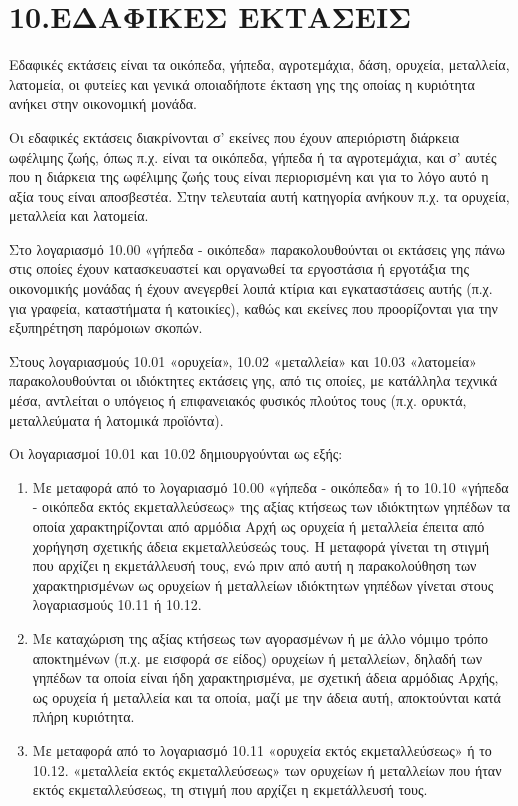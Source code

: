 \documentclass[A4,10pt,greek]{book}
\begin{document}
\section{10.ΕΔΑΦΙΚΕΣ ΕΚΤΑΣΕΙΣ}

Εδαφικές εκτάσεις είναι τα οικόπεδα, γήπεδα, αγροτεμάχια, δάση, ορυχεία, μεταλλεία, λατομεία, οι φυτείες και γενικά οποιαδήποτε έκταση γης της οποίας η κυριότητα ανήκει στην οικονομική μονάδα.

Οι εδαφικές εκτάσεις διακρίνονται σ' εκείνες που έχουν απεριόριστη διάρκεια ωφέλιμης ζωής, όπως π.χ. είναι τα οικόπεδα, γήπεδα ή τα αγροτεμάχια, και σ' αυτές που η διάρκεια της ωφέλιμης ζωής τους είναι περιορισμένη και για το λόγο αυτό η αξία τους είναι αποσβεστέα. Στην τελευταία αυτή κατηγορία ανήκουν π.χ.  τα ορυχεία, μεταλλεία και λατομεία.

Στο λογαριασμό 10.00 «γήπεδα - οικόπεδα» παρακολουθούνται οι εκτάσεις γης πάνω στις οποίες έχουν κατασκευαστεί και οργανωθεί τα εργοστάσια ή εργοτάξια της οικονομικής μονάδας ή έχουν ανεγερθεί λοιπά κτίρια και εγκαταστάσεις αυτής (π.χ. για γραφεία, καταστήματα ή κατοικίες), καθώς και εκείνες που προορίζονται για την εξυπηρέτηση παρόμοιων σκοπών.

Στους λογαριασμούς 10.01 «ορυχεία», 10.02 «μεταλλεία» και 10.03 «λατομεία» παρακολουθούνται οι ιδιόκτητες εκτάσεις γης, από τις οποίες, με κατάλληλα τεχνικά μέσα, αντλείται ο υπόγειος ή επιφανειακός φυσικός πλούτος τους (π.χ.  ορυκτά, μεταλλεύματα ή λατομικά προϊόντα).

Οι λογαριασμοί 10.01 και 10.02 δημιουργούνται ως εξής:

\begin{enumerate}

\item Με μεταφορά από το λογαριασμό 10.00 «γήπεδα - οικόπεδα» ή το 10.10 «γήπεδα - οικόπεδα εκτός εκμεταλλεύσεως» της αξίας κτήσεως των ιδιόκτητων γηπέδων τα οποία χαρακτηρίζονται από αρμόδια Αρχή ως ορυχεία ή μεταλλεία έπειτα από χορήγηση σχετικής άδεια εκμεταλλεύσεώς τους. Η μεταφορά γίνεται τη στιγμή που αρχίζει η εκμετάλλευσή τους, ενώ πριν από αυτή η παρακολούθηση των χαρακτηρισμένων ως ορυχείων ή μεταλλείων ιδιόκτητων γηπέδων γίνεται στους λογαριασμούς 10.11 ή 10.12.

\item Με καταχώριση της αξίας κτήσεως των αγορασμένων ή με άλλο νόμιμο τρόπο αποκτημένων (π.χ. με εισφορά σε είδος) ορυχείων ή μεταλλείων, δηλαδή των γηπέδων τα οποία είναι ήδη χαρακτηρισμένα, με σχετική άδεια αρμόδιας Αρχής, ως ορυχεία ή μεταλλεία και τα οποία, μαζί με την άδεια αυτή, αποκτούνται κατά πλήρη κυριότητα.

\item Με μεταφορά από το λογαριασμό 10.11 «ορυχεία εκτός εκμεταλλεύσεως» ή το 10.12. «μεταλλεία εκτός εκμεταλλεύσεως» των ορυχείων ή μεταλλείων που ήταν εκτός εκμεταλλεύσεως, τη στιγμή που αρχίζει η εκμετάλλευσή τους.

\end{enumerate}
\end{document}
